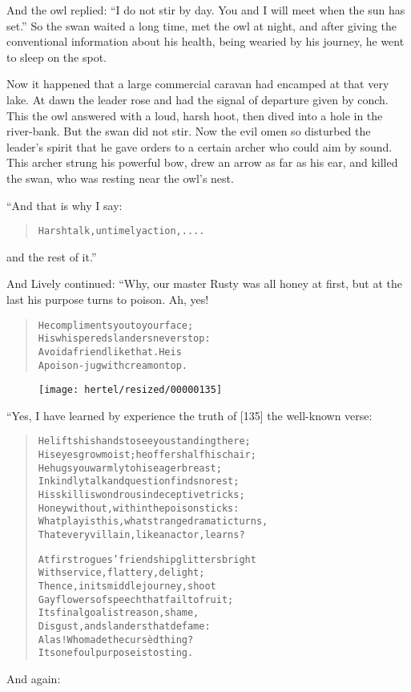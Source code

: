 \documentclass[article, twoside, 10pt]{memoir}
\renewenvironment{verbatim}{%
\begin{quote}%
\vskip -10pt%
\begin{alltt}\normalfont\small}{\end{alltt}%
\end{quote}%
\vskip -10pt
} %
\begin{document}
And the owl replied:
``I do not stir by day. You and I will meet when the sun has set.''
So the swan waited a long time, met the owl at night, and after
giving the conventional information about his health, being wearied
by his journey, he went to sleep on the spot.

Now it happened that a large commercial caravan had encamped at
that very lake. At dawn the leader rose and had the signal of
departure given by conch. This the owl answered with a loud, harsh
hoot, then dived into a hole in the river-bank. But the swan did
not stir. Now the evil omen so disturbed the leader's spirit that
he gave orders to a certain archer who could aim by sound. This
archer strung his powerful bow, drew an arrow as far as his ear,
and killed the swan, who was resting near the owl's nest.

“And that is why I say:

\begin{verbatim}
Harsh talk, untimely action,....
\end{verbatim}
and the rest of it.”

And Lively continued: “Why, our master Rusty was all honey at
first, but at the last his purpose turns to poison. Ah, yes!

\begin{verbatim}
He compliments you to your face;
    His whispered slanders never stop:
Avoid a friend like that. He is
    A poison-jug with cream on top.
\end{verbatim}
\begin{figure}[p]\texttt{[image: hertel/resized/00000135]}\end{figure}“Yes, I have learned by experience the truth of [135] the
well-known verse:

\begin{verbatim}
He lifts his hands to see you standing there;
His eyes grow moist; he offers half his chair;
He hugs you warmly to his eager breast;
In kindly talk and question finds no rest;
His skill is wondrous in deceptive tricks;
Honey without, within the poison sticks:
What play is this, what strange dramatic turns,
That every villain, like an actor, learns?

At first rogues' friendship glitters bright
With service, flattery, delight;
Thence, in its middle journey, shoot
Gay flowers of speech that fail to fruit;
Its final goal is treason, shame,
Disgust, and slanders that defame:
Alas! Who made the cursèd thing?
Its one foul purpose is to sting.
\end{verbatim}
And again:
\end{document}

